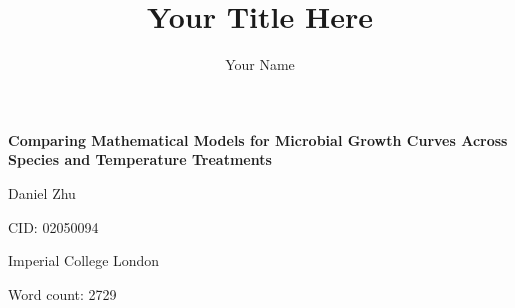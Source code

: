 \documentclass[11pt]{article}
\title{Your Title Here}
\author{Your Name}
\date{}
\begin{document}
\onehalfspacing
\begin{titlepage}
    \centering
    
    \vspace*{3cm}
    
    {\LARGE \textbf{Comparing Mathematical Models for Microbial Growth Curves Across Species and Temperature Treatments}
\par}
    
    \vspace{2cm}
    
    {\large Daniel Zhu\par}
    
    \vspace{0.5cm}

    {\large CID: 02050094\par}

    \vspace{0.5cm}
    
    {\large Imperial College London\par}
    
    \vspace{0.5cm}
    
    {\large Word count: 2729\par}
    
    \vfill
\end{titlepage}
\end{document}
